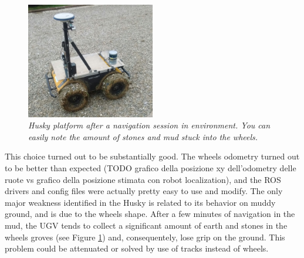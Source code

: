 \begin{figure}
	\centering
	\includegraphics[width=0.5\textwidth]{Images/grape_sw_hw_architecture/ruoteFangose.jpeg}
	\caption{\textit{Husky platform after a navigation session in environment. You can easily note the amount of stones and mud stuck into the wheels.}}
	\label{fig:ruoteFangose}
\end{figure}

This choice turned out to be substantially good. The wheels odometry turned out to be  better than expected (TODO grafico della posizione xy dell'odometry delle ruote vs grafico della posizione stimata con robot localization), and the \ac{ROS} drivers and config files were actually pretty easy to use and modify. The only major weakness identified in the Husky is related to its behavior on muddy ground, and is due to the wheels shape. After a few minutes of navigation in the mud, the \ac{UGV} tends to collect a significant amount of earth and stones in the wheels groves (see Figure \ref{fig:ruoteFangose}) and, consequentely, lose grip on the ground. This problem could be attenuated or solved by use of tracks instead of wheels.



